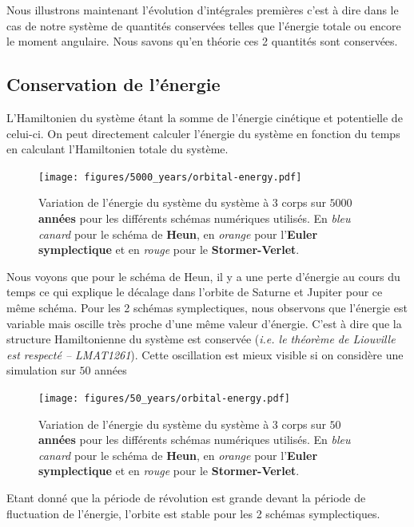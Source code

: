 \documentclass[11pt,twoside=semi,openright,numbers=noenddot]{article}
\begin{document}
Nous illustrons maintenant l'évolution d'intégrales premières c'est à dire dans le cas de notre système de quantités conservées telles que l'énergie totale ou encore le moment angulaire. Nous savons qu'en théorie ces 2 quantités sont conservées.

\subsection{Conservation de l'énergie}

L'Hamiltonien du système étant la somme de l'énergie cinétique et potentielle de celui-ci. On peut directement calculer l'énergie du système en fonction du temps en calculant l'Hamiltonien totale du système.

\begin{figure}[H]
    \centering
    \texttt{[image: figures/5000\_years/orbital-energy.pdf]}
    \caption{Variation de l'énergie du système du système à 3 corps sur \textbf{$5000$ années} pour les différents schémas numériques utilisés. En \emph{bleu canard} pour le schéma de \textbf{Heun}, en \emph{orange} pour l'\textbf{Euler symplectique} et en \emph{rouge} pour le \textbf{Stormer-Verlet}.}
    \label{fig:orbital-energy--5000}
\end{figure}

Nous voyons que pour le schéma de Heun, il y a une perte d'énergie au cours du temps ce qui explique le décalage dans l'orbite de Saturne et Jupiter pour ce même schéma. Pour les 2 schémas symplectiques, nous observons que l'énergie est variable mais oscille très proche d'une même valeur d'énergie. C'est à dire que la structure Hamiltonienne du système est conservée (\emph{i.e. le théorème de Liouville est respecté -- LMAT1261}). Cette oscillation est mieux visible si on considère une simulation sur $50$ années

\begin{figure}[H]
  \centering
  \texttt{[image: figures/50\_years/orbital-energy.pdf]}
  \caption{Variation de l'énergie du système du système à 3 corps sur \textbf{$50$ années} pour les différents schémas numériques utilisés. En \emph{bleu canard} pour le schéma de \textbf{Heun}, en \emph{orange} pour l'\textbf{Euler symplectique} et en \emph{rouge} pour le \textbf{Stormer-Verlet}.}
  \label{fig:orbital-energy--50}
\end{figure}


Etant donné que la période de révolution est grande devant la période de fluctuation de l'énergie, l'orbite est stable pour les 2 schémas symplectiques.
\end{document}
